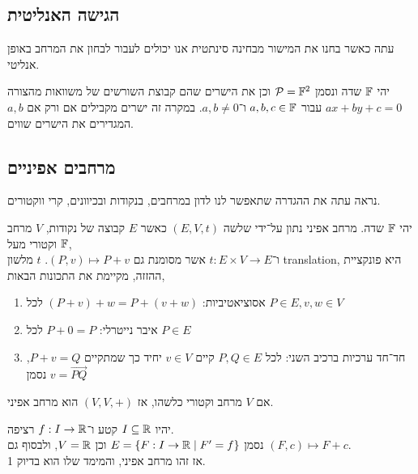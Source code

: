 \subsection{הגישה האנליטית}
עתה כאשר בחנו את המישור מבחינה סינתטית אנו יכולים לעבור לבחון את המרחב באופן אנליטי.
\begin{definition}
	יהי $\mathbb{F}$ שדה ונסמן $\mathcal{P} = \mathbb{F}^2$ וכן את הישרים שהם קבוצת השורשים של משוואות מהצורה $ax + by + c = 0$ עבור $a, b, c \in \mathbb{F}$ ו־$a, b \ne 0$.
	במקרה זה ישרים מקבילים אם ורק אם $a, b$ המגדירים את הישרים שווים.
\end{definition}

\subsection{מרחבים אפיניים}
נראה עתה את ההגדרה שתאפשר לנו לדון במרחבים, בנקודות ובכיוונים, קרי ווקטורים.
\begin{definition}
	יהי $\mathbb{F}$ שדה.
	מרחב אפיני נתון על־ידי שלשה $(E, V, t)$ כאשר $E$ קבוצה של נקודות, $V$ מרחב וקטורי מעל $\mathbb{F}$, \\
	ו־$t : E \times V \to E$ אשר מסומנת גם $(P, v) \mapsto P + v$.
	$t$ מלשון translation, היא פונקציית ההזזה, מקיימת את התכונות הבאות,
	\begin{enumerate}
		\item אסוציאטיביות: $(P + v) + w = P + (v + w)$ לכל $P \in E, v, w \in V$
		\item איבר נייטרלי: $P + 0 = P$ לכל $P \in E$
		\item חד־חד ערכיות ברכיב השני: לכל $P, Q \in E$ קיים $v \in V$ יחיד כך שמתקיים $P + v = Q$, נסמן $v = \overrightarrow{P Q}$
	\end{enumerate}
\end{definition}
\begin{example}
	אם $V$ מרחב וקטורי כלשהו, אז $(V, V, +)$ הוא מרחב אפיני.
\end{example}
\begin{example}
	יהיו $I \subseteq \mathbb{R}$ קטע ו־$f : I \to \mathbb{R}$ רציפה. \\
	נסמן $E = \{ F : I \to \mathbb{R} \mid F' = f \}$ וכן $V = \mathbb{R}$, ולבסוף גם $(F, c) \mapsto F + c$. \\
	אז זהו מרחב אפיני, והמימד שלו הוא בדיוק 1.
\end{example}

\listoftheorems[title=הגדרות ומשפטים,ignoreall,show={theorem,definition},swapnumber,onlynamed={proposition,lemma}]


